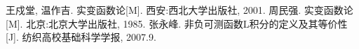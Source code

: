 \documentclass[12pt, a4paper, oneside]{ctexart}
\numberwithin{equation}{section}  %
\begin{document}
\begin{thebibliography}{99}
     王戍堂, 温作吉. 实变函数论[M]. 西安:西北大学出版社, 2001.
     周民强. 实变函数论[M]. 北京:北京大学出版社, 1985.
     张永峰. 非负可测函数L积分的定义及其等价性[J]. 纺织高校基础科学学报, 2007.9.
\end{thebibliography}
\end{document}
